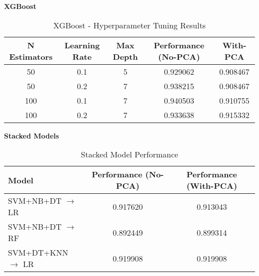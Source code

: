 \documentclass[11pt]{article}
\begin{document}
\vspace{2.5cm}
\textbf{XGBoost}
\begin{table}[H]
\centering
\caption{XGBoost - Hyperparameter Tuning Results}
\begin{tabular}{|c|c|c|c|c|} 
\hline
\textbf{N Estimators} & \textbf{Learning Rate} & \textbf{Max Depth} & \textbf{Performance (No-PCA)} & \textbf{With-PCA} \\
\hline
50  & 0.1 & 5 & 0.929062 & 0.908467 \\
50  & 0.2 & 7 & 0.938215 & 0.908467 \\
100 & 0.1 & 7 & 0.940503 & 0.910755 \\ %
100 & 0.2 & 7 & 0.933638 & 0.915332 \\
\hline
\end{tabular}
\end{table}

\vspace{1.2cm}
\textbf{Stacked Models}
\begin{table}[H]
\centering
\caption{Stacked Model Performance}
\begin{tabular}{|l|c|c|} 
\hline
\textbf{Model} & \textbf{Performance (No-PCA)} & \textbf{Performance (With-PCA)} \\
\hline
SVM+NB+DT $\rightarrow$ LR & 0.917620 & 0.913043 \\
SVM+NB+DT $\rightarrow$ RF & 0.892449 & 0.899314 \\
SVM+DT+KNN $\rightarrow$ LR & 0.919908 & 0.919908 \\
\hline
\end{tabular}
\end{table}
\end{document}
